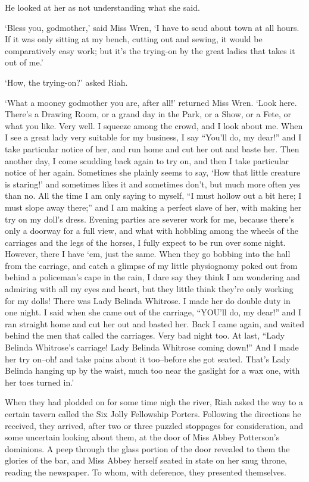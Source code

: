 He looked at her as not understanding what she said.

‘Bless you, godmother,’ said Miss Wren, ‘I have to scud about town at
all hours. If it was only sitting at my bench, cutting out and sewing,
it would be comparatively easy work; but it’s the trying-on by the great
ladies that takes it out of me.’

‘How, the trying-on?’ asked Riah.

‘What a mooney godmother you are, after all!’ returned Miss Wren. ‘Look
here. There’s a Drawing Room, or a grand day in the Park, or a Show, or
a Fete, or what you like. Very well. I squeeze among the crowd, and I
look about me. When I see a great lady very suitable for my business, I
say “You’ll do, my dear!” and I take particular notice of her, and run
home and cut her out and baste her. Then another day, I come scudding
back again to try on, and then I take particular notice of her again.
Sometimes she plainly seems to say, ‘How that little creature is
staring!’ and sometimes likes it and sometimes don’t, but much more
often yes than no. All the time I am only saying to myself, “I must
hollow out a bit here; I must slope away there;” and I am making a
perfect slave of her, with making her try on my doll’s dress. Evening
parties are severer work for me, because there’s only a doorway for a
full view, and what with hobbling among the wheels of the carriages
and the legs of the horses, I fully expect to be run over some night.
However, there I have ‘em, just the same. When they go bobbing into the
hall from the carriage, and catch a glimpse of my little physiognomy
poked out from behind a policeman’s cape in the rain, I dare say they
think I am wondering and admiring with all my eyes and heart, but they
little think they’re only working for my dolls! There was Lady Belinda
Whitrose. I made her do double duty in one night. I said when she came
out of the carriage, “YOU’ll do, my dear!” and I ran straight home and
cut her out and basted her. Back I came again, and waited behind the men
that called the carriages. Very bad night too. At last, “Lady Belinda
Whitrose’s carriage! Lady Belinda Whitrose coming down!” And I made her
try on--oh! and take pains about it too--before she got seated. That’s
Lady Belinda hanging up by the waist, much too near the gaslight for a
wax one, with her toes turned in.’

When they had plodded on for some time nigh the river, Riah asked
the way to a certain tavern called the Six Jolly Fellowship Porters.
Following the directions he received, they arrived, after two or three
puzzled stoppages for consideration, and some uncertain looking about
them, at the door of Miss Abbey Potterson’s dominions. A peep through
the glass portion of the door revealed to them the glories of the bar,
and Miss Abbey herself seated in state on her snug throne, reading the
newspaper. To whom, with deference, they presented themselves.

